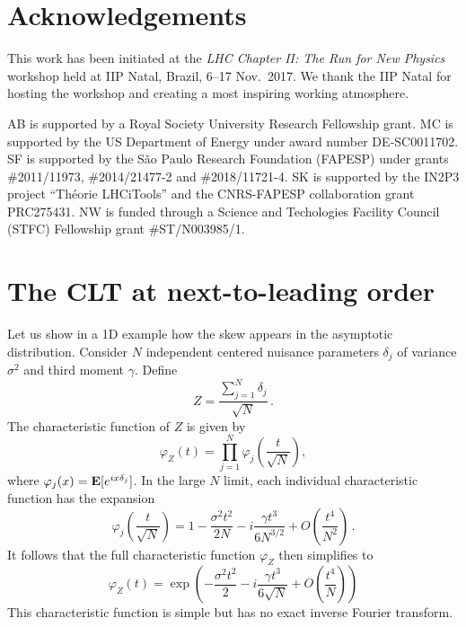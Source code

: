 \documentclass[11pt]{article}
\newcommand{\be}{\begin{equation}}
\newcommand{\ee}{\end{equation}}
\begin{document}
\section*{Acknowledgements}

This work has been initiated at the \textit{LHC Chapter II: The Run for New Physics} workshop held at IIP Natal, Brazil,  6--17 Nov.\ 2017. 
We thank the IIP Natal for hosting the workshop and creating a most inspiring working atmosphere.

AB is supported by a Royal Society University Research Fellowship grant. 
MC is supported by the US Department of Energy under award number DE‐SC0011702.
SF is supported by the S\~ao Paulo Research Foundation (FAPESP) under grants \#2011/11973, \#2014/21477-2 and  	
\#2018/11721-4. 
SK is supported by the IN2P3 project ``Th\'eorie LHCiTools'' and the CNRS-FAPESP collaboration grant PRC275431. 
NW is funded through a Science and Techologies Facility Council (STFC) Fellowship grant \#ST/N003985/1.


\appendix

\section{The CLT at next-to-leading order}
\label{app:skew}


Let us show in a 1D example how the skew appears  in the asymptotic distribution. Consider $N$ independent centered nuisance parameters $\delta_j$ of variance $\sigma^2$ and third moment $\gamma$. Define \be Z=\frac{\sum_{j=1}^N \delta_j}{\sqrt{N}}\,.
\ee
The characteristic function of $Z$ is given by
\be
\varphi_Z(t)=\prod_{j=1}^N\varphi_{j}\left(\frac{t}{\sqrt{N}}\right),
\ee
where $\varphi_{j}(x) = {\bf E}[e^{ix\delta_{j}}]$.
 In the large $N$ limit, each individual characteristic function has the expansion
\be
\varphi_{j}\left(\frac{t}{\sqrt{N}}\right)= 1-\frac{\sigma^2 t^2}{2N}-i \frac{\gamma t^3}{6 N^{3/2}} +O\left(\frac{t^4}{N^2}\right)\,.
\ee
It follows that the full characteristic function $\varphi_Z$ then simplifies to
\be
\varphi_Z(t)=\exp\left(-\frac{\sigma^2 t^2}{2}-i \frac{\gamma t^3}{6 \sqrt{N}} +O\left(\frac{t^4}{N}\right)\right) \label{eq:CF_CLT}
 \ee
 This characteristic function is simple but has no exact inverse Fourier transform.
\end{document}
